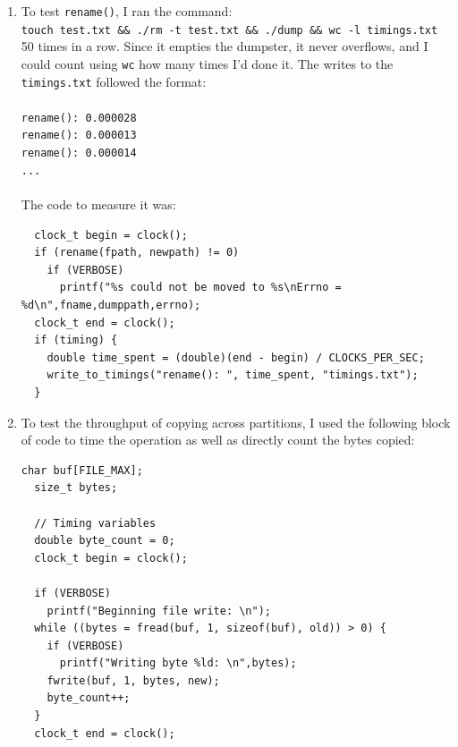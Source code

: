 \documentclass[10pt]{article}
\begin{document}
\begin{enumerate}
\item To test \texttt{rename()}, I ran the command: \\
  \texttt{touch test.txt \&\& ./rm -t test.txt \&\& ./dump \&\& wc -l timings.txt} \\
  50 times in a row. Since it empties the dumpster, it never overflows, and I could count using \texttt{wc} how many times I'd done it. The writes to the \texttt{timings.txt} followed the format: \\ \\
  \texttt{rename(): 0.000028} \\
  \texttt{rename(): 0.000013} \\
  \texttt{rename(): 0.000014} \\
  \texttt{...} \\\\
  The code to measure it was:
\begin{verbatim}
  clock_t begin = clock();
  if (rename(fpath, newpath) != 0) 
    if (VERBOSE) 
      printf("%s could not be moved to %s\nErrno = %d\n",fname,dumppath,errno);
  clock_t end = clock();
  if (timing) {
    double time_spent = (double)(end - begin) / CLOCKS_PER_SEC;
    write_to_timings("rename(): ", time_spent, "timings.txt");
  }
\end{verbatim}
\item To test the throughput of copying across partitions, I used the following block of code to time the operation as well as directly count the bytes copied: \\
\begin{verbatim}
char buf[FILE_MAX];
  size_t bytes;

  // Timing variables
  double byte_count = 0;
  clock_t begin = clock();
  
  if (VERBOSE) 
    printf("Beginning file write: \n");
  while ((bytes = fread(buf, 1, sizeof(buf), old)) > 0) {
    if (VERBOSE) 
      printf("Writing byte %ld: \n",bytes);
    fwrite(buf, 1, bytes, new);
    byte_count++;
  }
  clock_t end = clock();


\end{verbatim}
\end{enumerate}
\end{document}
